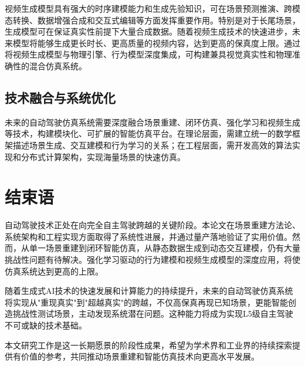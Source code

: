 视频生成模型具有强大的时序建模能力和生成先验知识，可在场景预测推演、跨模态转换、数据增强合成和交互式编辑等方面发挥重要作用。特别是对于长尾场景，生成模型可在保证真实性前提下大量合成数据。随着视频生成技术的快速进步，未来模型将能够生成更长时长、更高质量的视频内容，达到更高的保真度上限。通过将视频生成模型与物理引擎、行为模型深度集成，可构建兼具视觉真实性和物理准确性的混合仿真系统。

\subsection{技术融合与系统优化}

未来的自动驾驶仿真系统需要深度融合场景重建、闭环仿真、强化学习和视频生成等技术，构建模块化、可扩展的智能仿真平台。在理论层面，需建立统一的数学框架描述场景生成、交互建模和行为学习的关系；在工程层面，需开发高效的算法实现和分布式计算架构，实现海量场景的快速仿真。

\section{结束语}

自动驾驶技术正处在向完全自主驾驶跨越的关键阶段。本论文在场景重建方法论、系统架构和工程实现方面取得了系统性进展，并通过量产落地验证了实用价值。然而，从单一场景重建到闭环智能仿真，从静态数据生成到动态交互建模，仍有大量挑战性问题有待解决。强化学习驱动的行为建模和视频生成模型的深度应用，将使仿真系统达到更高的上限。

随着生成式AI技术的快速发展和计算能力的持续提升，未来的自动驾驶仿真系统将实现从"重现真实"到"超越真实"的跨越，不仅高保真再现已知场景，更能智能创造挑战性测试场景，主动发现系统潜在问题。这种能力将成为实现L5级自主驾驶不可或缺的技术基础。

本文研究工作是这一长期愿景的阶段性成果，希望为学术界和工业界的持续探索提供有价值的参考，共同推动场景重建和智能仿真技术向更高水平发展。

